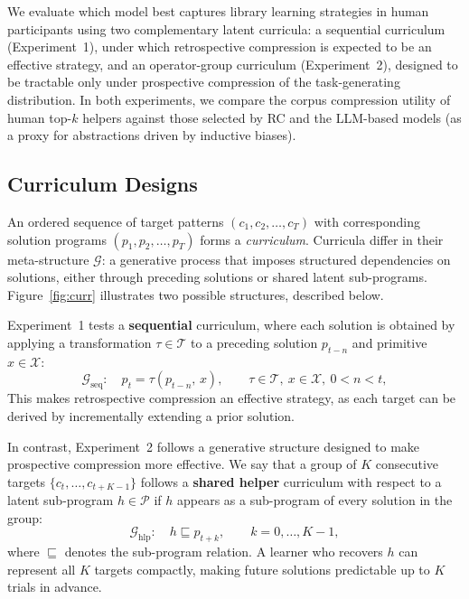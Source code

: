 \documentclass{article}
\begin{document}
We evaluate which model best captures library learning strategies in human participants using two complementary latent curricula: a sequential curriculum (Experiment~1), under which retrospective compression is expected to be an effective strategy, and an operator-group curriculum (Experiment~2), designed to be tractable only under prospective compression of the task-generating distribution. In both experiments, we compare the corpus compression utility of human top-$k$ helpers 
against those selected by RC and the LLM-based models (as a proxy for abstractions driven by inductive biases).

\subsection{Curriculum Designs}

An ordered sequence of target patterns $(c_1, c_2, \ldots, c_T)$ with corresponding solution programs $(p_1, p_2, \ldots, p_T)$ forms a \textit{curriculum}. Curricula differ in their meta-structure $\mathcal{G}$: a generative process that imposes structured dependencies on solutions, 
either through preceding solutions or shared latent sub-programs. Figure~\ref{fig:curr} illustrates two possible structures, described below.

Experiment~1 tests a \textbf{sequential} curriculum, where each solution is obtained by applying a transformation $\tau \in \mathcal{T}$ to a preceding solution $p_{t-n}$ and primitive $x \in \mathcal{X}$:
\[
\mathcal{G}_{\mathrm{seq}}: \quad p_{t} = \tau(p_{t-n},\, x), 
\qquad \tau \in \mathcal{T},\ x \in \mathcal{X},\ 0 < n < t,
\]
This makes retrospective compression an effective strategy, as each target can be derived by incrementally extending a prior solution.

In contrast, Experiment~2 follows a generative structure designed to make prospective compression more effective. We say that a group of $K$ consecutive targets $\{c_t, \ldots, c_{t+K-1}\}$ follows a \textbf{shared helper} curriculum with respect to a latent sub-program $h \in \mathcal{P}$ 
if $h$ appears as a sub-program of every solution in the group:
\[
\mathcal{G}_{\mathrm{hlp}}: \quad h \sqsubseteq p_{t+k}, 
\qquad k = 0, \ldots, K-1,
\]
where $\sqsubseteq$ denotes the sub-program relation. A learner who recovers $h$ can represent all $K$ targets compactly, making future solutions predictable up to $K$ trials in advance.
\end{document}
